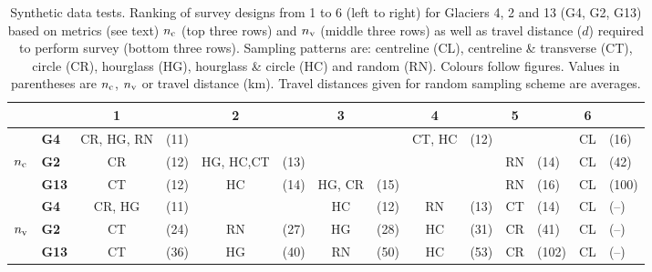 \documentclass{article}
\begin{document}
\begin{table}[]
\footnotesize
\centering
\caption{Synthetic data tests. Ranking of survey designs from 1 to 6 (left to right) for Glaciers 4, 2 and 13 (G4, G2, G13) based on metrics (see text) $n_{\rm c}$ (top three rows) and $n_{\rm v}$ (middle three rows) as well as travel distance ($d$) required to perform survey (bottom three rows). Sampling patterns are: centreline (CL), centreline \& transverse (CT), circle (CR), hourglass (HG), hourglass \& circle (HC) and random (RN). Colours follow figures. Values in parentheses are $n_{\rm c}$, $n_{\rm v}$ or travel distance (km). Travel distances given for random sampling scheme are averages.}
\label{tab:SynthPatternRanks}
\begin{tabular}{clclclclclclcl}
\hline
          && \textbf{1} && \textbf{2} && \textbf{3} && \textbf{4} && \textbf{5} && \textbf{6} \\
 \hline
                & \textbf{G4}    & \textcolor{CR}{CR}, \textcolor{HG}{HG}, \textcolor{RN}{RN}         & (11)         &          &         & 	& 	&  \textcolor{CT}{CT}, \textcolor{HC}{HC}         & (12)                 &          &  & \textcolor{CL}{CL} & (16) \\
$n_{\rm c}$         & \textbf{G2}   & \textcolor{CR}{CR}         & (12)                   &  \textcolor{HG}{HG}, \textcolor{HC}{HC},\textcolor{CT}{CT}          & (13)         &      &  & &         & \textcolor{RN}{RN}        & (14)  &   \textcolor{CL}{CL} & (42) \\
                & \textbf{G13} & \textcolor{CT}{CT}         & (12)         & \textcolor{HC}{HC} & (14)         &    \textcolor{HG}{HG}, \textcolor{CR}{CR}               & (15)         & & &  \textcolor{RN}{RN}                &        (16)          & \textcolor{CL}{CL} & (100) \\
\hline
                & \textbf{G4}   & \textcolor{CR}{CR},  \textcolor{HG}{HG}         & (11)         &         &           & \textcolor{HC}{HC}         & (12)         & \textcolor{RN}{RN}                 & (13)         & \textcolor{CT}{CT} & (14) & \textcolor{CL}{CL} & (--) \\
$n_{\rm v}$         & \textbf{G2}   & \textcolor{CT}{CT}         & (24)         &  \textcolor{RN}{RN}         & (27)    &	 \textcolor{HG}{HG}  & (28)    & \textcolor{HC}{HC}        & (31)              &  \textcolor{CR}{CR}         & (41) & \textcolor{CL}{CL} & (--) \\
                & \textbf{G13} & \textcolor{CT}{CT}         & (36)         & \textcolor{HG}{HG}         & (40)         & \textcolor{RN}{RN}                 & (50)         &    \textcolor{HC}{HC}      &     (53)     & \textcolor{CR}{CR}         & (102) & \textcolor{CL}{CL} & (--) \\

\end{tabular}
\end{table}
\end{document}
